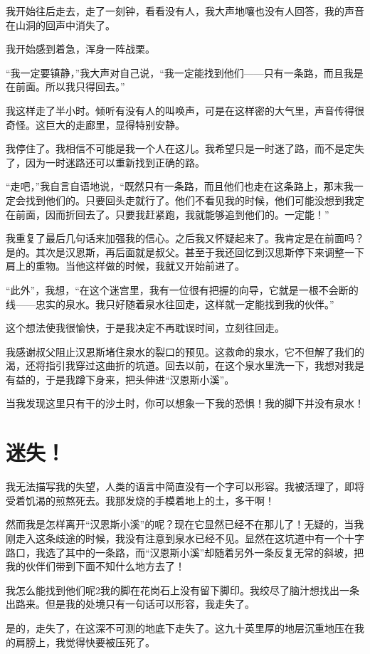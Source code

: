 \documentclass[10pt]{book}
\begin{document}
我开始往后走去，走了一刻钟，看看没有人，我大声地嚷也没有人回答，我的声音在山洞的回声中消失了。

我开始感到着急，浑身一阵战栗。

“我一定要镇静，”我大声对自己说，“我一定能找到他们——只有一条路，而且我是在前面。所以我只得回去。”

我这样走了半小时。倾听有没有人的叫唤声，可是在这样密的大气里，声音传得很奇怪。这巨大的走廊里，显得特别安静。

我停住了。我相信不可能是我一个人在这儿。我希望只是一时迷了路，而不是定失了，因为一时迷路还可以重新找到正确的路。

“走吧，”我自言自语地说，“既然只有一条路，而且他们也走在这条路上，那末我一定会找到他们的。只要回头走就行了。他们不看见我的时候，他们可能没想到我定在前面，因而折回去了。只要我赶紧跑，我就能够追到他们的。一定能！”

我重复了最后几句话来加强我的信心。之后我又怀疑起来了。我肯定是在前面吗？是的。其次是汉恩斯，再后面就是叔父。甚至于我还回忆到汉思斯停下来调整一下肩上的重物。当他这样做的时候，我就又开始前进了。

“此外”，我想，“在这个迷宫里，我有一位很有把握的向导，它就是一根不会断的线——忠实的泉水。我只好随着泉水往回走，这样就一定能找到我的伙伴。”

这个想法使我很愉快，于是我决定不再耽误时间，立刻往回走。

我感谢叔父阻止汉恩斯堵住泉水的裂口的预见。这救命的泉水，它不但解了我们的渴，还将指引我穿过这曲折的坑道。回去以前，在这个泉水里洗一下，我想对我是有益的，于是我蹲下身来，把头伸进“汉恩斯小溪”。

当我发现这里只有干的沙土时，你可以想象一下我的恐惧！我的脚下并没有泉水！
\chapter{迷失！}
我无法描写我的失望，人类的语言中简直没有一个字可以形容。我被活理了，即将受着饥渴的煎熬死去。我那发烧的手模着地上的土，多干啊！

然而我是怎样离开“汉恩斯小溪”的呢？现在它显然已经不在那儿了！无疑的，当我刚走入这条歧途的时候，我没有注意到泉水已经不见。显然在这坑道中有一个十字路口，我选了其中的一条路，而“汉恩斯小溪”却随着另外一条反复无常的斜坡，把我的伙伴们带到下面不知什么地方去了！

我怎么能找到他们呢2我的脚在花岗石上没有留下脚印。我绞尽了脑汁想找出一条出路来。但是我的处境只有一句话可以形容，我走失了。

是的，走失了，在这深不可测的地底下走失了。这九十英里厚的地层沉重地压在我的肩膀上，我觉得快要被压死了。
\end{document}
